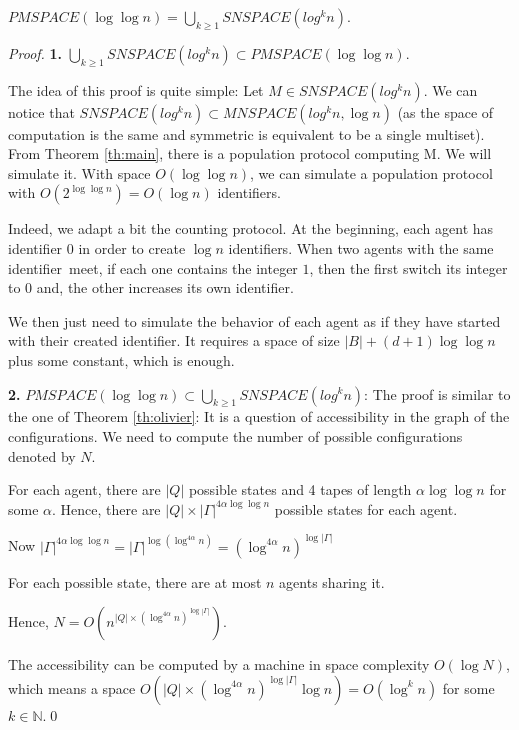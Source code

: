 \documentclass[UKenglish]{llncs}
\newcommand\N{\mathbb{N}}
\newcommand\id{identifier}
\begin{document}
\begin{theorem}\label{th:grec}
$PMSPACE(\log\log n)=\bigcup_{k\ge1}SNSPACE(log^kn)$.\end{theorem}
\begin{proof}
\textbf{1.} $\bigcup_{k\ge1}SNSPACE(log^kn)\subset PMSPACE(\log\log n)$.

The idea of this proof is quite simple: Let $M\in SNSPACE(log^kn)$.
We can notice that $SNSPACE(log^kn)\subset MNSPACE(log^k n, \log n)$ 
(as the space of computation is the same and symmetric is equivalent
to be a single multiset).
From Theorem \ref{th:main}, there is a population protocol computing M. We will simulate it.
With space $O(\log\log n)$, we can simulate
a population protocol with $O(2^{\log\log n})=O(\log n)$ identifiers.

Indeed, we adapt a bit the counting protocol.
 At the beginning, each agent has identifier $0$ in order to create $\log n$ identifiers.
When two agents with the same \id\ meet, if each one contains the integer $1$, then
the first switch its integer to $0$ and, the other increases its own \id.

We then just need to simulate the behavior of each agent as if they have started 
with their created \id. It requires a space of size $|B|+(d+1)\log\log n$ plus some constant,
which is enough.

\textbf{2.} $PMSPACE(\log\log n)\subset\bigcup_{k\ge1}SNSPACE(log^kn)$:
The proof is similar to the one of Theorem \ref{th:olivier}:
It is a question of accessibility in the  graph of the configurations.
We need to compute the number of possible configurations denoted by $N$.

For each agent, there are $|Q|$ possible states and 4 tapes of length
$\alpha\log\log n$ for some $\alpha$. Hence, there are $|Q|\times|\Gamma|^{4\alpha\log\log n}$
possible states for each agent.

Now $|\Gamma|^{4\alpha\log\log n}=|\Gamma|^{\log(\log^{4\alpha}n)}=\left( \log^{4\alpha}n\right)^{\log |\Gamma|}$

For each possible state, there are at most $n$ agents sharing it.

Hence, $N=O\left(n^{|Q|\times\left( \log^{4\alpha}n\right)^{\log |\Gamma|}}\right)$.


The accessibility can be computed by a machine in space complexity
$O(\log N)$, which means a space $O\left(|Q|\times\left( \log^{4\alpha}n\right)^{\log |\Gamma|}\log n\right)
=O(\log^kn)$ for some $k\in\N$.\hfill \qed

 \end{proof}
\end{document}
